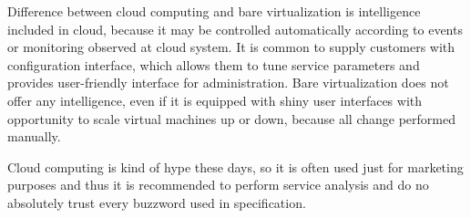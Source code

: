Difference between cloud computing and bare virtualization is intelligence included in cloud, because it may be controlled automatically according to events or monitoring observed at cloud system. It is common to supply customers with configuration interface, which allows them to tune service parameters and provides user-friendly interface for administration.
Bare virtualization does not offer any intelligence, even if it is equipped with shiny user interfaces with opportunity to scale virtual machines up or down, because all change performed manually.

Cloud computing is kind of hype these days, so it is often used just for marketing purposes and thus it is recommended to perform service analysis and do no absolutely trust every buzzword used in specification.
